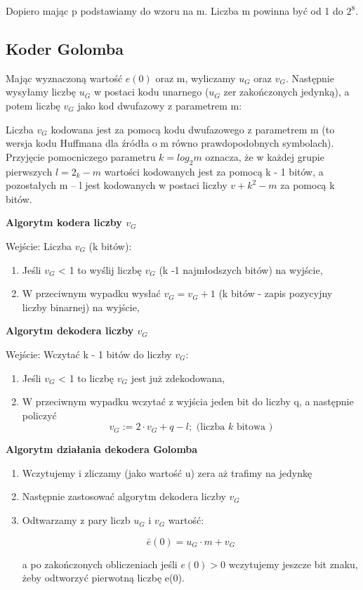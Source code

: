 \documentclass{article}
\begin{document}
Dopiero mając p podstawiamy do wzoru na m. Liczba m powinna być od 1 do $2^8$.

\subsection{Koder Golomba}

Mając wyznaczoną wartość $e(0)$ oraz m, wyliczamy $u_G$ oraz $v_G$. Następnie wysyłamy liczbę $u_G$ w postaci kodu unarnego ($u_G$ zer zakończonych jedynką), a potem liczbę $v_G$ jako kod dwufazowy z parametrem m:

Liczba $v_G$ kodowana jest za pomocą kodu dwufazowego z parametrem m (to wersja kodu Huffmana dla źródła o m równo prawdopodobnych symbolach). Przyjęcie pomocniczego parametru $k = log_2 m$ oznacza, że w każdej grupie pierwszych  $l = 2_k - m$ wartości kodowanych jest za pomocą k - 1 bitów, a pozostałych m – l jest kodowanych w postaci liczby $v + k^2 - m$ za pomocą k bitów.

\textbf{Algorytm kodera liczby $v_G$}

Wejście: Liczba $v_G$ (k bitów):

\begin{enumerate}
	\item Jeśli $v_G$ < 1 to wyślij liczbę $v_G$ (k -1 najmłodszych bitów) na wyjście,
	\item W przeciwnym wypadku wysłać $v_G = v_G + 1$ (k bitów - zapis pozycyjny liczby binarnej) na wyjście,
\end{enumerate}

\textbf{Algorytm dekodera liczby $v_G$}

Wejście: Wczytać k - 1 bitów do liczby $v_G$:

\begin{enumerate}
	\item Jeśli $v_G$ < 1 to liczbę $v_G$ jest już zdekodowana,
	\item W przeciwnym wypadku wczytać z wyjścia jeden bit do liczby q, a następnie policzyć 
	\begin{equation}
	v_{G}:=2 \cdot v_{G}+q-l ; \text { (liczba } k \text { bitowa })
	\end{equation}
\end{enumerate}

\textbf{Algorytm działania dekodera Golomba}

\begin{enumerate}
	\item Wczytujemy i zliczamy (jako wartość u) zera aż trafimy na jedynkę
	\item Następnie zastosować algorytm dekodera liczby $v_G$
	\item Odtwarzamy z pary liczb $u_G$ i $v_G$ wartość:
	
	\begin{equation}
	\bar{e}(0)=u_{G} \cdot m+v_{G}
	\end{equation}
	
	a po zakończonych obliczeniach jeśli $e(0) > 0$ wczytujemy jeszcze bit znaku, żeby odtworzyć pierwotną liczbę e(0).	
	
\end{enumerate}
\end{document}
